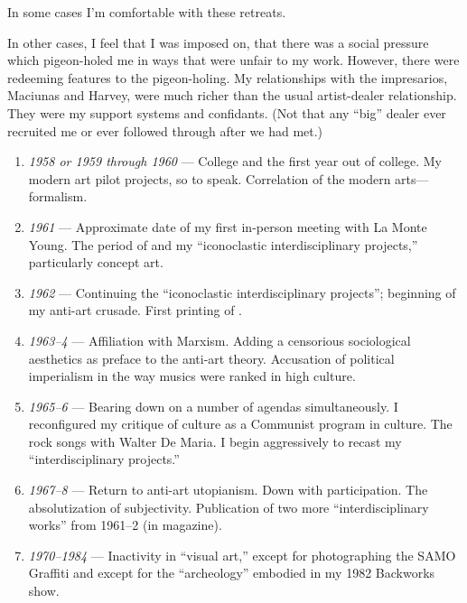 In some cases I'm comfortable with these retreats. 

In other cases, I feel that I was imposed on, that there was a social pressure which pigeon-holed me in ways that were unfair to my work.  However, there were redeeming features to the pigeon-holing.  My relationships with the impresarios, Maciunas and Harvey, were much richer than the usual artist-dealer relationship.  They were my support systems and confidants.   (Not that any \enquote{big} dealer ever recruited me or ever followed through after we had met.)

\Pb
 
\newcommand{\Ed}[1]{\textit{#1} --- } %
\begin{enumerate}[label=\Alph*]
\item \Ed{1958 or 1959 through 1960}  College and the first year out of college.  My modern art pilot projects, so to speak.  Correlation of the modern arts---formalism.

\item \Ed{1961} Approximate date of my first in-person meeting with La Monte Young.  The period of  and my \enquote{iconoclastic interdisciplinary projects,} particularly concept art.

\item \Ed{1962}  Continuing the \enquote{iconoclastic interdisciplinary projects}; beginning of my anti-art crusade.  First printing of .

\item \Ed{1963--4}  Affiliation with Marxism.  Adding a censorious sociological aesthetics as preface to the anti-art theory.  Accusation of political imperialism in the way musics were ranked in high culture.

\item \Ed{1965--6}  Bearing down on a number of agendas simultaneously.  I reconfigured my critique of culture as a Communist program in culture.  The rock songs with Walter De Maria.  I begin aggressively to recast my \enquote{interdisciplinary projects.}

\item \Ed{1967--8}  Return to anti-art utopianism.  Down with participation.  The absolutization of subjectivity.  Publication of two more \enquote{interdisciplinary works} from 1961--2 (in  magazine).

\item \Ed{1970--1984}  Inactivity in \enquote{visual art,} except for photographing the SAMO\scalebox{1.2}{\textcopyright} Graffiti and except for the \enquote{archeology} embodied in my 1982 Backworks show.


\end{enumerate}
